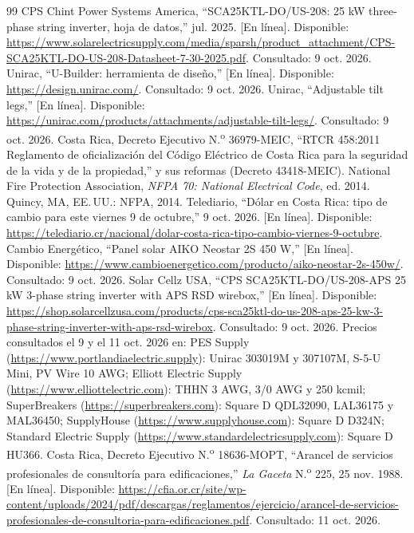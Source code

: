 \documentclass[10pt,letterpaper]{article}
\begin{document}
\begin{thebibliography}{99}
 CPS Chint Power Systems America, ``SCA25KTL-DO/US-208: 25 kW three-phase string inverter, hoja de datos,'' jul. 2025. [En línea]. Disponible: \url{https://www.solarelectricsupply.com/media/sparsh/product_attachment/CPS-SCA25KTL-DO-US-208-Datasheet-7-30-2025.pdf}. Consultado: 9 oct. 2026.
 Unirac, ``U-Builder: herramienta de diseño,'' [En línea]. Disponible: \url{https://design.unirac.com/}. Consultado: 9 oct. 2026.
 Unirac, ``Adjustable tilt legs,'' [En línea]. Disponible: \url{https://unirac.com/products/attachments/adjustable-tilt-legs/}. Consultado: 9 oct. 2026.
 Costa Rica, Decreto Ejecutivo N.\textsuperscript{o} 36979-MEIC, ``RTCR 458:2011 Reglamento de oficialización del Código Eléctrico de Costa Rica para la seguridad de la vida y de la propiedad,'' y sus reformas (Decreto 43418-MEIC).
 National Fire Protection Association, \textit{NFPA 70: National Electrical Code}, ed. 2014. Quincy, MA, EE.\,UU.: NFPA, 2014.
 Telediario, ``Dólar en Costa Rica: tipo de cambio para este viernes 9 de octubre,'' 9 oct. 2026. [En línea]. Disponible: \url{https://telediario.cr/nacional/dolar-costa-rica-tipo-cambio-viernes-9-octubre}.
 Cambio Energético, ``Panel solar AIKO Neostar 2S 450 W,'' [En línea]. Disponible: \url{https://www.cambioenergetico.com/producto/aiko-neostar-2s-450w/}. Consultado: 9 oct. 2026.
 Solar Cellz USA, ``CPS SCA25KTL-DO/US-208-APS 25 kW 3-phase string inverter with APS RSD wirebox,'' [En línea]. Disponible: \url{https://shop.solarcellzusa.com/products/cps-sca25ktl-do-us-208-aps-25-kw-3-phase-string-inverter-with-aps-rsd-wirebox}. Consultado: 9 oct. 2026.
 Precios consultados el 9 y el 11 oct. 2026 en: PES Supply (\url{https://www.portlandiaelectric.supply}): Unirac 303019M y 307107M, S-5-U Mini, PV Wire 10 AWG; Elliott Electric Supply (\url{https://www.elliottelectric.com}): THHN 3 AWG, 3/0 AWG y 250 kcmil; SuperBreakers (\url{https://superbreakers.com}): Square D QDL32090, LAL36175 y MAL36450; SupplyHouse (\url{https://www.supplyhouse.com}): Square D D324N; Standard Electric Supply (\url{https://www.standardelectricsupply.com}): Square D HU366.
 Costa Rica, Decreto Ejecutivo N.\textsuperscript{o} 18636-MOPT, ``Arancel de servicios profesionales de consultoría para edificaciones,'' \textit{La Gaceta} N.\textsuperscript{o} 225, 25 nov. 1988. [En línea]. Disponible: \url{https://cfia.or.cr/site/wp-content/uploads/2024/pdf/descargas/reglamentos/ejercicio/arancel-de-servicios-profesionales-de-consultoria-para-edificaciones.pdf}. Consultado: 11 oct. 2026.

\end{thebibliography}
\end{document}
